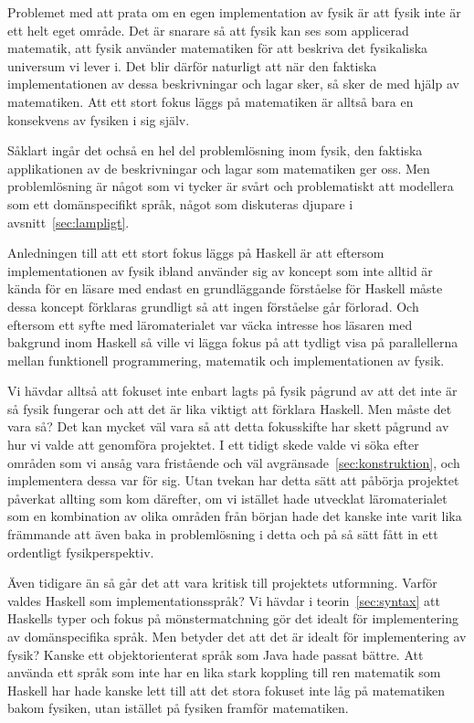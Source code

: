 \begin{draft}
Problemet med att prata om en egen implementation av fysik är att fysik inte är
ett helt eget område. Det är snarare så att fysik kan ses som applicerad
matematik, att fysik använder matematiken för att beskriva det fysikaliska
universum vi lever i. Det blir därför naturligt att när den faktiska
implementationen av dessa beskrivningar och lagar sker, så sker de med hjälp av
matematiken. Att ett stort fokus läggs på matematiken är alltså bara en
konsekvens av fysiken i sig själv.

Såklart ingår det ochså en hel del problemlösning inom fysik, den faktiska
applikationen av de beskrivningar och lagar som matematiken ger oss. Men
problemlösning är något som vi tycker är svårt och problematiskt att modellera
som ett domänspecifikt språk, något som diskuteras djupare i
avsnitt~\ref{sec:lampligt}.

Anledningen till att ett stort fokus läggs på Haskell är att eftersom
implementationen av fysik ibland använder sig av koncept som inte alltid är
kända för en läsare med endast en grundläggande förståelse för Haskell måste
dessa koncept förklaras grundligt så att ingen förståelse går förlorad. Och
eftersom ett syfte med läromaterialet var väcka intresse hos läsaren med
bakgrund inom Haskell så ville vi lägga fokus på att tydligt visa på
parallellerna mellan funktionell programmering, matematik och implementationen
av fysik. 

Vi hävdar alltså att fokuset inte enbart lagts på fysik pågrund av att det inte
är så fysik fungerar och att det är lika viktigt att förklara Haskell. Men måste
det vara så? Det kan mycket väl vara så att detta fokusskifte har skett pågrund
av hur vi valde att genomföra projektet. I ett tidigt skede valde vi söka efter
områden som vi ansåg vara fristående och väl avgränsade~\ref{sec:konstruktion},
och implementera dessa var för sig. Utan tvekan har detta sätt att påbörja
projektet påverkat allting som kom därefter, om vi istället hade utvecklat
läromaterialet som en kombination av olika områden från början hade det kanske
inte varit lika främmande att även baka in problemlösning i detta och på så sätt
fått in ett ordentligt fysikperspektiv. 

Även tidigare än så går det att vara kritisk till projektets utformning. Varför
valdes Haskell som implementationsspråk? Vi hävdar i teorin~\ref{sec:syntax} att
Haskells typer och fokus på mönstermatchning gör det idealt för implementering
av domänspecifika språk.  Men betyder det att det är idealt för implementering
av fysik? Kanske ett objektorienterat språk som Java hade passat bättre. Att
använda ett språk som inte har en lika stark koppling till ren matematik som
Haskell har hade kanske lett till att det stora fokuset inte låg på matematiken
bakom fysiken, utan istället på fysiken framför matematiken.


\end{draft}
